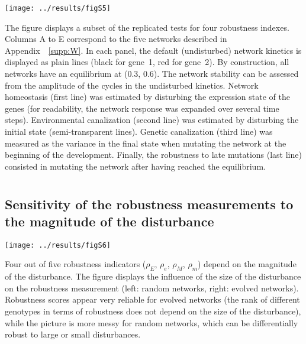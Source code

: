 \documentclass[10pt,a4paper]{article}
\newcommand{\earlyenv}{{\rho_E}}
\newcommand{\lateenv}{{\rho_e}}
\newcommand{\earlymut}{{\rho_M}}
\newcommand{\latemut}{{\rho_m}}
\newcommand{\SupMat}{Appendix~}
\begin{document}
\begin{appendices}
	\begin{adjustwidth}{-1in}{0in}
	\begin{flushright}
	\texttt{[image: ../results/figS5]}
	\end{flushright}
	\color{Gray} The figure displays a subset of the replicated tests for four robustness indexes. Columns A to E correspond to the five networks described in \SupMat~\ref{supp:W}. In each panel, the default (undisturbed) network kinetics is displayed as plain lines (black for gene~1, red for gene~2). By construction, all networks have an equilibrium at (0.3, 0.6). The network stability can be assessed from the amplitude of the cycles in the undisturbed kinetics. Network homeostasis (first line) was estimated by disturbing the expression state of the genes (for readability, the network response was expanded over several time steps). Environmental canalization (second line) was estimated by disturbing the initial state (semi-transparent lines). Genetic canalization (third line) was measured as the variance in the final state when mutating the network at the beginning of the development. Finally, the robustness to late mutations (last line) consisted in mutating the network after having reached the equilibrium.
	\end{adjustwidth}

  \clearpage
  \section{}
    \label{supp:sensitmag}
    \subsection*{Sensitivity of the robustness measurements to the magnitude of the disturbance}
	\begin{center}
	\texttt{[image: ../results/figS6]}
	\end{center}
	{\color{Gray} Four out of five robustness indicators ($\earlyenv$, $\lateenv$, $\earlymut$, $\latemut$) depend on the magnitude of the disturbance. The figure displays the influence of the size of the disturbance on the robustness measurement (left: random networks, right: evolved networks). Robustness scores appear very reliable for evolved networks (the rank of different genotypes in terms of robustness does not depend on the size of the disturbance), while the picture is more messy for random networks, which can be differentially robust to large or small disturbances. }



\end{appendices}
\end{document}
